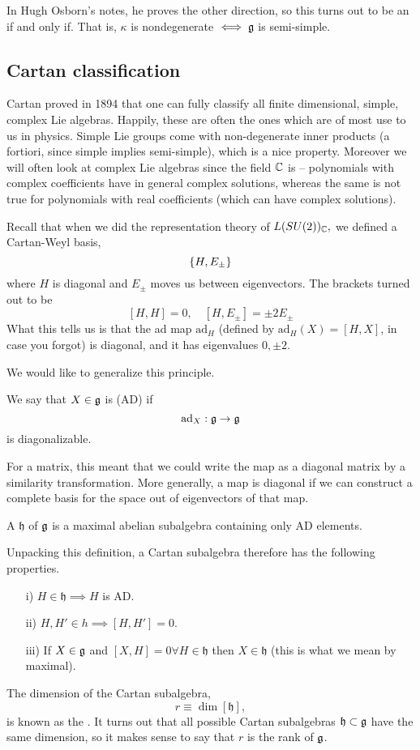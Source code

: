 In Hugh Osborn's notes, he proves the other direction, so this turns out to be an if and only if. That is, $\kappa$ is nondegenerate $\iff \mathfrak{g}$ is semi-simple.

\subsection*{Cartan classification} Cartan proved in 1894 that one can fully classify all finite dimensional, simple, complex Lie algebras. Happily, these are often the ones which are of most use to us in physics. Simple Lie groups come with non-degenerate inner products (a fortiori, since simple implies semi-simple), which is a nice property. Moreover we will often look at complex Lie algebras since the field $\mathbb{C}$ is -- polynomials with complex coefficients have in general complex solutions, whereas the same is not true for polynomials with real coefficients (which can have complex solutions).

Recall that when we did the representation theory of $L(SU(2))_{\mathbb{C}},$ we defined a Cartan-Weyl basis,
$$\{H,E_\pm\}$$ where $H$ is diagonal and $E_\pm$ moves us between eigenvectors. The brackets turned out to be
$$[H,H]=0,\quad [H,E_\pm]=\pm 2 E_{\pm}$$
What this tells us is that the ad map $\text{ad}_H$ (defined by $\text{ad}_H(X)=[H,X]$, in case you forgot) is diagonal, and it has eigenvalues $0,\pm 2$.

We would like to generalize this principle.
\begin{defn}
We say that $X\in \mathfrak{g}$ is  (AD) if
$$\text{ad}_X:\mathfrak{g} \to \mathfrak{g}$$
is diagonalizable.
\end{defn}
For a matrix, this meant that we could write the map as a diagonal matrix by a similarity transformation. More generally, a map is diagonal if we can construct a complete basis for the space out of eigenvectors of that map.

\begin{defn}
A  $\mathfrak{h}$ of $\mathfrak{g}$ is a maximal abelian subalgebra containing only AD elements.
\end{defn}
Unpacking this definition, a Cartan subalgebra therefore has the following properties.
\begin{itemize}
    \item[i)] $H\in \mathfrak{h}\implies H$ is AD.
    \item[ii)] $H,H'\in h \implies [H,H']=0.$
    \item[iii)] If $X\in \mathfrak{g}$ and $[X,H]=0 \forall H \in \mathfrak{h}$ then $X\in \mathfrak{h}$ (this is what we mean by maximal).
\end{itemize}
\begin{defn}
The dimension of the Cartan subalgebra,
$$r\equiv \dim[\mathfrak{h}],$$
is known as the . It turns out that all possible Cartan subalgebras $\mathfrak{h}\subset \mathfrak{g}$ have the same dimension, so it makes sense to say that $r$ is the rank of $\mathfrak{g}$.
\end{defn}

